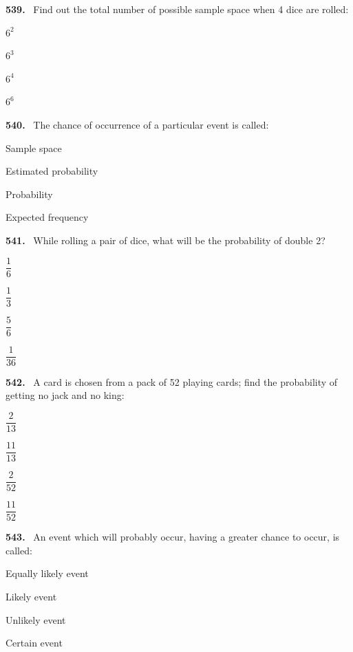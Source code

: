 \documentclass[11pt]{article}
\newenvironment{qenv}[1]{%
  \par\medskip\noindent\textbf{#1.}\ \ignorespaces
}{\par}
\begin{document}
\begin{qenv}{539} Find out the total number of possible sample space when 4 dice are rolled:
\begin{options} \item $6^2$ \item $6^3$ \item $6^4$ \item $6^6$ \end{options} \end{qenv}

\begin{qenv}{540} The chance of occurrence of a particular event is called:
\begin{options} \item Sample space \item Estimated probability \item Probability \item Expected frequency \end{options} \end{qenv}

\begin{qenv}{541} While rolling a pair of dice, what will be the probability of double 2?
\begin{options} \item $\dfrac{1}{6}$ \item $\dfrac{1}{3}$ \item $\dfrac{5}{6}$ \item $\dfrac{1}{36}$ \end{options} \end{qenv}

\begin{qenv}{542} A card is chosen from a pack of 52 playing cards; find the probability of getting no jack and no king:
\begin{options} \item $\dfrac{2}{13}$ \item $\dfrac{11}{13}$ \item $\dfrac{2}{52}$ \item $\dfrac{11}{52}$ \end{options} \end{qenv}

\begin{qenv}{543} An event which will probably occur, having a greater chance to occur, is called:
\begin{options} \item Equally likely event \item Likely event \item Unlikely event \item Certain event \end{options} \end{qenv}
\end{document}
